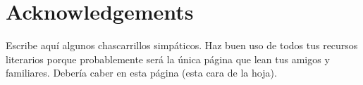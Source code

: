 \chapter{Acknowledgements}

Escribe aquí algunos chascarrillos simpáticos. Haz buen uso de todos tus
recursos literarios porque probablemente será la única página que lean tus
amigos y familiares. Debería caber en esta página (esta cara de la hoja).


